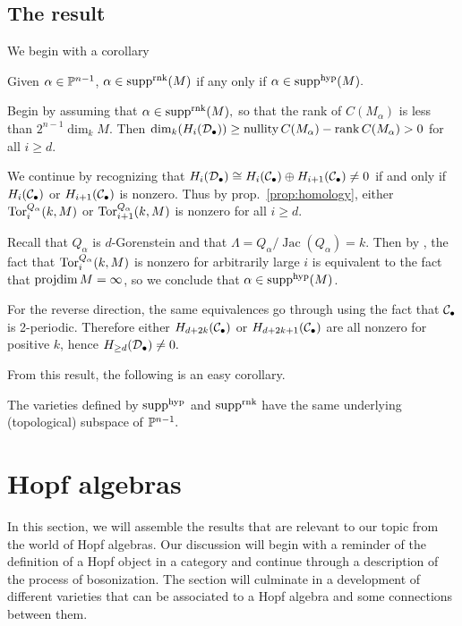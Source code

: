 \documentclass[12pt]{article}
\begin{document}
\subsection{The result}
We begin with a corollary
\begin{thm}
    Given $\alpha\in\mathbb{P}^{n-1}$, $\alpha\in\operatorname{supp}^\mathrm{rnk}(M)$ if any only if $\alpha\in \operatorname{supp}^\mathrm{hyp}(M).$
\end{thm}
\begin{prf}
    Begin by assuming that $\alpha\in\operatorname{supp}^\textrm{rnk}(M),$ so that the rank of $C(M_\alpha)$ is less than $2^{n-1}\dim_kM.$ Then $\dim_k(H_i(\mathcal{D}_\bullet))\ge\operatorname{nullity}C(M_\alpha)-\operatorname{rank} C(M_\alpha)>0$ for all $i\ge d$.
    
    We continue by recognizing that $H_i(\mathcal{D}_\bullet)\cong H_i(\mathcal{C}_\bullet)\oplus H_{i+1}(\mathcal{C}_\bullet)\ne0$ if and only if $H_i(\mathcal{C}_\bullet)$ or $H_{i+1}(\mathcal{C}_\bullet)$ is nonzero. Thus by prop.~\ref{prop:homology}, either $\operatorname{Tor}^{Q_\alpha}_i(k,M)$ or $\operatorname{Tor}^{Q_\alpha}_{i+1}(k,M)$ is nonzero for all $i\ge d$. 

    Recall that $Q_\alpha$ is $d$-Gorenstein and that $\Lambda = Q_\alpha/\operatorname{Jac}(Q_\alpha)=k$. Then by \cite[cor. 3.2]{negron-pevtsovaII}, the fact that $\operatorname{Tor}^{Q_\alpha}_i(k,M)$ is nonzero for arbitrarily large $i$ is equivalent to the fact that $\operatorname{projdim} M=\infty$, so we conclude that $\alpha\in\operatorname{supp}^\mathrm{hyp}(M)$.
    
    For the reverse direction, the same equivalences go through using the fact that $\mathcal{C}_\bullet$ is 2-periodic. Therefore either $H_{d+2k}(\mathcal{C}_\bullet)$ or $H_{d+2k+1}(\mathcal{C}_\bullet)$ are all nonzero for positive $k$, hence $H_{\ge d}(\mathcal{D}_\bullet)\ne0.$
\end{prf}

From this result, the following is an easy corollary.
\begin{cor}
    The varieties defined by $\operatorname{supp}^\textrm{hyp}$ and $\operatorname{supp}^\textrm{rnk}$ have the same underlying (topological) subspace of $\mathbb{P}^{n-1}.$
\end{cor}

\section{Hopf algebras}
In this section, we will assemble the results that are relevant to our topic from the world of Hopf algebras. Our discussion will begin with a reminder of the definition of a Hopf object in a category and continue through a description of the process of bosonization. The section will culminate in a development of different varieties that can be associated to a Hopf algebra and some connections between them.
\end{document}
